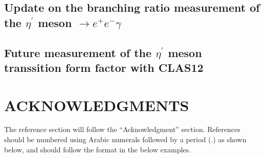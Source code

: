 \documentclass{aip-cp}
\begin{document}
\subsection{Update on the branching ratio measurement  of the $\eta^\prime$ meson $\rightarrow e^+e^-\gamma$}
\subsection{Future measurement of the $\eta^\prime$ meson transsition form factor with CLAS12}

\section{ACKNOWLEDGMENTS}
The reference section will follow the ``Acknowledgment'' section.  References should be numbered using Arabic numerals followed by a period (.) as shown below, and should follow the format in the below examples.


\nocite{*}
%
%
\end{document}
